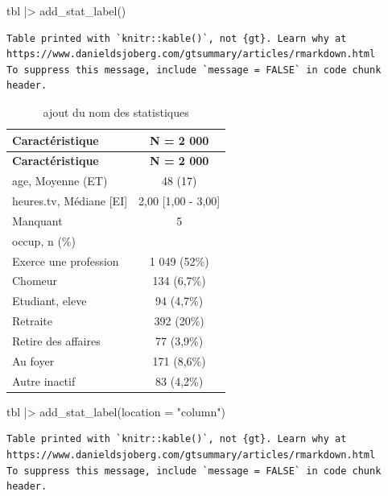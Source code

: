 \documentclass[
  letterpaper,
  DIV=11,
  numbers=noendperiod,
  oneside]{scrreprt}
\newenvironment{Shaded}{\begin{snugshade}}{\end{snugshade}}
\newcommand{\AttributeTok}[1]{\textcolor[rgb]{0.40,0.45,0.13}{#1}}
\newcommand{\FunctionTok}[1]{\textcolor[rgb]{0.28,0.35,0.67}{#1}}
\newcommand{\NormalTok}[1]{\textcolor[rgb]{0.00,0.23,0.31}{#1}}
\newcommand{\SpecialCharTok}[1]{\textcolor[rgb]{0.37,0.37,0.37}{#1}}
\newcommand{\StringTok}[1]{\textcolor[rgb]{0.13,0.47,0.30}{#1}}
\begin{document}
\begin{Shaded}
\begin{Highlighting}[]
\NormalTok{tbl }\SpecialCharTok{|\textgreater{}} 
  \FunctionTok{add\_stat\_label}\NormalTok{()}
\end{Highlighting}
\end{Shaded}

\begin{verbatim}
Table printed with `knitr::kable()`, not {gt}. Learn why at
https://www.danieldsjoberg.com/gtsummary/articles/rmarkdown.html
To suppress this message, include `message = FALSE` in code chunk header.
\end{verbatim}

\hypertarget{tbl-stat-nom-2}{}
\begin{longtable}[]{@{}lc@{}}
\caption{\label{tbl-stat-nom-2}ajout du nom des
statistiques}\tabularnewline
\toprule()
\textbf{Caractéristique} & \textbf{N = 2 000} \\
\midrule()
\endfirsthead
\toprule()
\textbf{Caractéristique} & \textbf{N = 2 000} \\
\midrule()
\endhead
age, Moyenne (ET) & 48 (17) \\
heures.tv, Médiane {[}EI{]} & 2,00 {[}1,00 - 3,00{]} \\
Manquant & 5 \\
occup, n (\%) & \\
Exerce une profession & 1 049 (52\%) \\
Chomeur & 134 (6,7\%) \\
Etudiant, eleve & 94 (4,7\%) \\
Retraite & 392 (20\%) \\
Retire des affaires & 77 (3,9\%) \\
Au foyer & 171 (8,6\%) \\
Autre inactif & 83 (4,2\%) \\
\bottomrule()
\end{longtable}

\begin{Shaded}
\begin{Highlighting}[]
\NormalTok{tbl }\SpecialCharTok{|\textgreater{}} 
  \FunctionTok{add\_stat\_label}\NormalTok{(}\AttributeTok{location =} \StringTok{"column"}\NormalTok{)}
\end{Highlighting}
\end{Shaded}

\begin{verbatim}
Table printed with `knitr::kable()`, not {gt}. Learn why at
https://www.danieldsjoberg.com/gtsummary/articles/rmarkdown.html
To suppress this message, include `message = FALSE` in code chunk header.
\end{verbatim}
\end{document}
